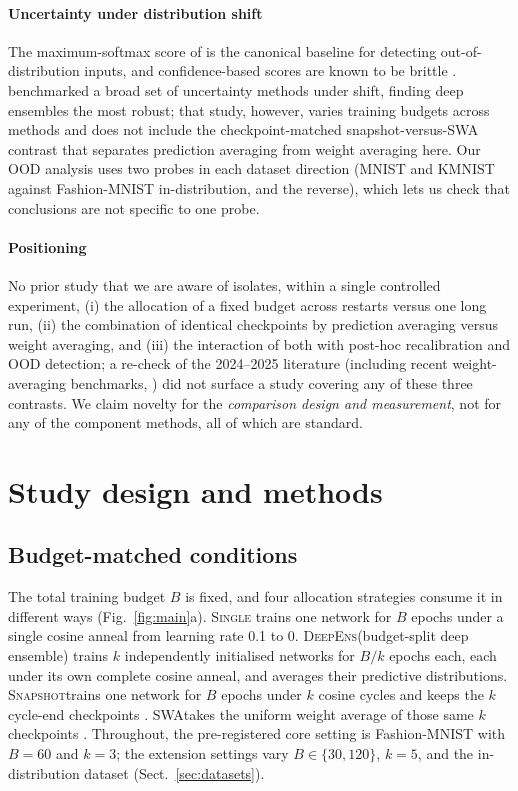 \documentclass[11pt,a4paper]{article}
\newcommand{\deepens}{\textsc{DeepEns}}
\newcommand{\snapshot}{\textsc{Snapshot}}
\newcommand{\swa}{\textsc{SWA}}
\newcommand{\single}{\textsc{Single}}
\begin{document}
\paragraph{Uncertainty under distribution shift}
The maximum-softmax score of \citet{hendrycks2017} is the canonical
baseline for detecting out-of-distribution inputs, and confidence-based
scores are known to be brittle \citep{nguyen2015}. \citet{ovadia2019}
benchmarked a broad set of uncertainty methods under shift, finding deep
ensembles the most robust; that study, however, varies training budgets
across methods and does not include the checkpoint-matched
snapshot-versus-\swa{} contrast that separates prediction averaging from
weight averaging here. Our OOD analysis uses two probes in each dataset
direction (MNIST and KMNIST against Fashion-MNIST in-distribution, and the
reverse), which lets us check that conclusions are not specific to one
probe.

\paragraph{Positioning}
No prior study that we are aware of isolates, within a single controlled
experiment, (i) the allocation of a fixed budget across restarts versus one
long run, (ii) the combination of identical checkpoints by prediction
averaging versus weight averaging, and (iii) the interaction of both with
post-hoc recalibration and OOD detection; a re-check of the 2024--2025
literature (including recent weight-averaging benchmarks,
\citealp{ajroldi2025}) did not surface a study covering any of these three
contrasts. We claim novelty for the \emph{comparison design and
measurement}, not for any of the component methods, all of which are
standard.
\section{Study design and methods}\label{sec:methods}

\subsection{Budget-matched conditions}\label{sec:conditions}

The total training budget $B$ is fixed, and four allocation strategies
consume it in different ways (Fig.~\ref{fig:main}a). \single{}
trains one network for $B$ epochs under a single cosine anneal from learning
rate 0.1 to 0. \deepens (budget-split deep ensemble) trains $k$
independently initialised networks for $B/k$ epochs each, each under its own
complete cosine anneal, and averages their predictive distributions.
\snapshot trains one network for $B$ epochs under $k$ cosine
cycles \citep{loshchilov2017} and keeps the $k$ cycle-end checkpoints
\citep{huang2017}. \swa takes the uniform weight average of those
same $k$ checkpoints \citep{izmailov2018}. Throughout, the pre-registered
core setting is Fashion-MNIST with $B=60$ and $k=3$; the extension settings
vary $B \in \{30,120\}$, $k=5$, and the in-distribution dataset
(Sect.~\ref{sec:datasets}).
\end{document}
